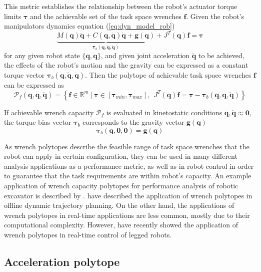 This metric establishes the relationship between the robot's actuator torque limits $\bm{\tau}$ and the achievable set of the task space wrenches $\bm{f}$.
Given the robot's manipulators dynamics equation (\ref{eq:dyn_model_rob}) 
\begin{equation}
\underbrace{M(\bm{q})\ddot{\bm{q}} + C(\bm{q},\dot{\bm{q}})\dot{\bm{q}} + \bm{g}(\bm{q})}_{\bm{\tau}_b(\bm{q},\dot{\bm{q}},\ddot{\bm{q}})} + J^T(\bm{q})\bm{f} = \bm{\tau} 
\end{equation}
for any given robot state $\{\bm{q},\dot{\bm{q}}\}$, and given joint acceleration $\ddot{\bm{q}}$ to be achieved, the effects of the robot's motion and the gravity can be expressed as a constant torque vector $\bm{\tau}_b(\bm{q},\dot{\bm{q}},\ddot{\bm{q}})$. Then the polytope of achievable task space wrenches $\bm{f}$ can be expressed as
\begin{equation}
    \mathcal{P}_f(\bm{q},\dot{\bm{q}},\ddot{\bm{q}}) = \left\{ \bm{f} \in \mathbb{R}^m ~|~ \bm{\tau}\in\left[\bm{\tau}_{min}, \bm{\tau}_{max} \right], ~~ J^T(\bm{q})\bm{f} = \bm{\tau} -\bm{\tau}_b(\bm{q},\dot{\bm{q}},\ddot{\bm{q}}) \right\}
    \label{eq:poly_force_rob}
\end{equation}

If achievable wrench capacity $\mathcal{P}_f$ is evaluated in kinetostatic conditions $\dot{\bm{q}},\ddot{\bm{q}}\approx\bm{0}$, the torque bias vector $\bm{\tau}_b$ corresponds to the gravity vector $\bm{g}(\bm{q})$ 
\begin{equation}
    \bm{\tau}_b(\bm{q},\bm{0},\bm{0}) = \bm{g}(\bm{q})
\end{equation}

As wrench polytopes describe the feasible range of task space wrenches that the robot can apply in certain configuration, they can be used in many different analysis applications as a performance metric, as well as in robot control in order to guarantee that the task requirements are within robot's capacity. An example application of wrench capacity polytopes for performance analysis of robotic excavator is described by \citet{Zou2019}. \citet{ferrolho_residual_2020} have described the application of wrench polytopes in offline dynamic trajectory planning. On the other hand, the applications of wrench polytopes in real-time applications are less common, mostly due to their computational complexity. However, \citet{Orsolino2018} have recently showed the application of wrench polytopes in real-time control of legged robots.

\subsection{Acceleration polytope}
\label{ch:accel_poly_robot}

